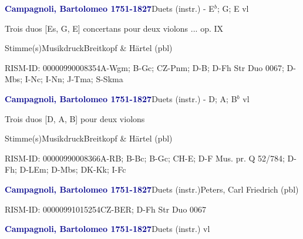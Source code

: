 \documentclass[twocolumn]{book}
\begin{document}
\par \vspace{7pt} \textcolor{darkblue}{\textbf{Campagnoli, Bartolomeo  1751-1827}}\hfillplus{\textbf{[257]}}\newline Duets (instr.) - E$^b$; G; E vl
\par \begin{itshape}Trois duos [Es, G, E] concertans pour deux violons ... op. IX\end{itshape} 
\par \textcolor{darkblue}{}  Stimme(s)\newline Musikdruck\newline Breitkopf \& Härtel  (pbl)
\par RISM-ID: 00000990008354\newline A-Wgm; B-Gc; CZ-Pnm; D-B; D-Fh  Str Duo 0067; D-Mbs; I-Nc; I-Nn; J-Tma; S-Skma
\par \vspace{7pt} \textcolor{darkblue}{\textbf{Campagnoli, Bartolomeo  1751-1827}}\hfillplus{\textbf{[258]}}\newline Duets (instr.) - D; A; B$^b$ vl
\par \begin{itshape}Trois duos [D, A, B] pour deux violons\end{itshape} 
\par \textcolor{darkblue}{}  Stimme(s)\newline Musikdruck\newline Breitkopf \& Härtel  (pbl)
\par RISM-ID: 00000990008366\newline A-RB; B-Bc; B-Gc; CH-E; D-F  Mus. pr. Q 52/784; D-Fh; D-LEm; D-Mbs; DK-Kk; I-Fc
\par \vspace{7pt} \textcolor{darkblue}{\textbf{Campagnoli, Bartolomeo  1751-1827}}\hfillplus{\textbf{[259]}}\newline Duets (instr.)\newline Peters, Carl Friedrich  (pbl)
\par RISM-ID: 00000991015254\newline CZ-BER; D-Fh  Str Duo 0067
\par \vspace{7pt} \textcolor{darkblue}{\textbf{Campagnoli, Bartolomeo  1751-1827}}\hfillplus{\textbf{[260]}}\newline Duets (instr.) vl
\end{document}
